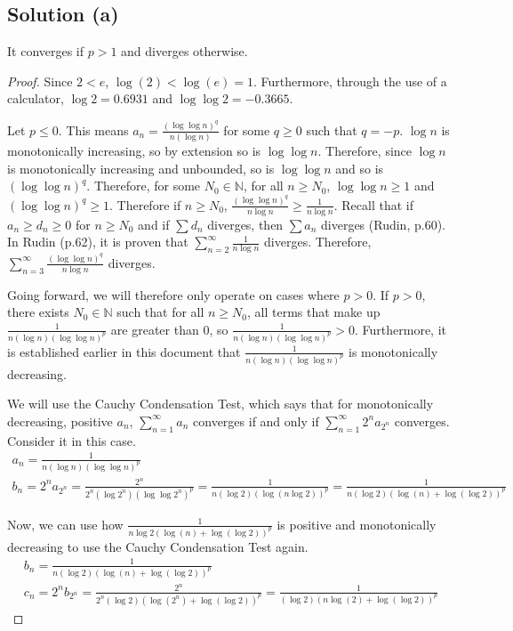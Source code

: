 \documentclass[11pt]{article}
\begin{document}
    \subsection{Solution (a)}
        It converges if $p > 1$ and diverges otherwise.
    \begin{proof}
        Since $2 < e$, $\log(2) < \log(e) = 1$.
        Furthermore, through the use of a calculator, $\log 2 = 0.6931$ and $\log \log 2 = -0.3665$.

        Let $p \leq 0$.
        This means $a_n = \frac{(\log \log n)^q}{n (\log n)}$ for some $q \geq 0$ such that $q = -p$.
        $\log n$ is monotonically increasing, so by extension so is $\log \log n$.
        Therefore, since $\log n$ is monotonically increasing and unbounded, so is $\log \log n$ and so is $(\log \log n)^q$.
        Therefore, for some $N_0 \in \mathbb{N}$, for all $n \geq N_0$, $\log \log n \geq 1$ and $(\log \log n)^q \geq 1$.
        Therefore if $n \geq N_0$, $\frac{(\log \log n)^q}{n \log n} \geq \frac{1}{n \log n}$.
        Recall that if $a_n \geq d_n \geq 0$ for $n \geq N_0$ and if $\sum d_n$ diverges, then $\sum a_n$ diverges (Rudin, p.60).
        In Rudin (p.62), it is proven that $\sum_{n=2}^{\infty} \frac{1}{n\log n}$ diverges.
        Therefore, $\sum_{n = 3}^{\infty} \frac{(\log \log n)^q}{n \log n}$ diverges.

        Going forward, we will therefore only operate on cases where $p > 0$.
        If $p > 0$, there exists $N_0 \in \mathbb{N}$ such that for all $n \geq N_0$, all terms that make up $\frac{1}{n(\log n)(\log \log n)^p}$ are greater than $0$, so $\frac{1}{n(\log n)(\log \log n)^p} > 0$.
        Furthermore, it is established earlier in this document that $\frac{1}{n(\log n)(\log \log n)^p}$ is monotonically decreasing.

        We will use the Cauchy Condensation Test, which says that for monotonically decreasing, positive $a_n$, $\sum_{n=1}^{\infty} a_n$ converges if and only if $\sum_{n=1}^{\infty} 2^n a_{2^n}$ converges.
        Consider it in this case.
        \begin{gather}
            a_n =   \frac{1}{n(\log n)(\log \log n)^p}\\
            b_n =   2^n a_{2^n} 
                =   \frac{2^n}{2^n(\log 2^n)(\log \log 2^n)^p}
                =   \frac{1}{n (\log 2) (\log (n \log 2))^p}
                =   \frac{1}{n (\log 2) (\log (n) + \log (\log 2))^p}
        \end{gather}

        Now, we can use how $\frac{1}{n \log 2 (\log (n) + \log (\log 2))^p}$ is positive and monotonically decreasing to use the Cauchy Condensation Test again.
        \begin{gather}
            b_n =   \frac{1}{n (\log 2) (\log (n) + \log (\log 2))^p}\\
            c_n =   2^n b_{2^n}
                =   \frac{2^n}{2^n (\log 2) (\log (2^n) + \log (\log 2))^p}
                =   \frac{1}{(\log 2) (n \log (2) + \log (\log 2))^p}
        \end{gather}


\end{proof}
\end{document}
